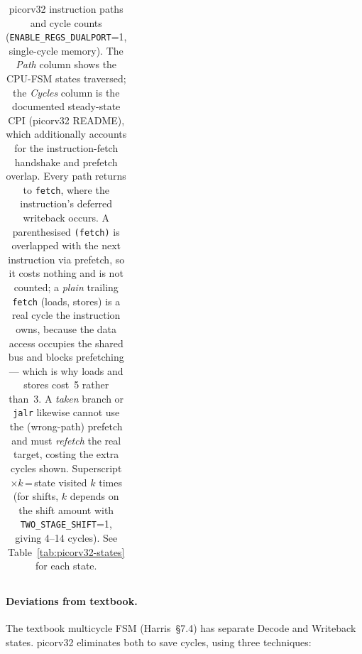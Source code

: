 \documentclass[9pt, a4paper]{extarticle}
\begin{document}
\begin{table}[htbp]
\begin{tabular}{@{}l l l l c@{}}
    \bottomrule
\end{tabular}
\caption{picorv32 instruction paths and cycle counts (\texttt{ENABLE\_REGS\_DUALPORT}=1, single-cycle memory). The \emph{Path} column shows the CPU-FSM states traversed; the \emph{Cycles} column is the documented steady-state CPI (picorv32 README), which additionally accounts for the instruction-fetch handshake and prefetch overlap. Every path returns to \texttt{fetch}, where the instruction's deferred writeback occurs. A parenthesised \texttt{(fetch)} is overlapped with the next instruction via prefetch, so it costs nothing and is not counted; a \emph{plain} trailing \texttt{fetch} (loads, stores) is a real cycle the instruction owns, because the data access occupies the shared bus and blocks prefetching --- which is why loads and stores cost~5 rather than~3. A \emph{taken} branch or \texttt{jalr} likewise cannot use the (wrong-path) prefetch and must \emph{refetch} the real target, costing the extra cycles shown. Superscript $\times k$\,=\,state visited $k$ times (for shifts, $k$ depends on the shift amount with \texttt{TWO\_STAGE\_SHIFT}=1, giving 4--14 cycles). See Table~\ref{tab:picorv32-states} for each state.}
\label{tab:picorv32-cpi}
\end{table}

\paragraph{Deviations from textbook.} The textbook multicycle FSM (Harris~\S7.4) has separate Decode and Writeback states. picorv32 eliminates both to save cycles, using three techniques:
\end{document}
